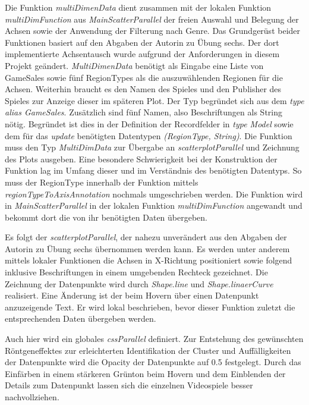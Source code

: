 \documentclass[usegeometry=true]{scrartcl}
\begin{document}
Die Funktion \textit{multiDimenData} dient zusammen mit der lokalen Funktion \textit{multiDimFunction} aus \textit{MainScatterParallel} der freien Auswahl und Belegung der Achsen sowie der Anwendung der Filterung nach Genre. 
Das Grundgerüst beider Funktionen basiert auf den Abgaben der Autorin zu Übung sechs. 
Der dort implementierte Achsentausch wurde aufgrund der Anforderungen in diesem Projekt geändert.
\textit{MultiDimenData} benötigt als Eingabe eine Liste von GameSales sowie fünf RegionTypes als die auszuwählenden Regionen für die Achsen. 
Weiterhin braucht es den Namen des Spieles und den Publisher des Spieles zur Anzeige dieser im späteren Plot. 
Der Typ begründet sich aus dem \textit{type alias GameSales}.
Zusätzlich sind fünf Namen, also Beschriftungen als String nötig. 
Begründet ist dies in der Definition der Recordfelder in \textit{type Model} sowie dem für das \textit{update} benötigten Datentypen \textit{(RegionType, String)}.
Die Funktion muss den Typ \textit{MultiDimData} zur Übergabe an \textit{scatterplotParallel} und Zeichnung des Plots ausgeben. 
Eine besondere Schwierigkeit bei der Konstruktion der Funktion lag im Umfang dieser und im Verständnis des benötigten Datentyps. 
So muss der RegionType innerhalb der Funktion mittels \textit{regionTypeToAxisAnnotation} nochmals umgeschrieben werden. 
Die Funktion wird in \textit{MainScatterParallel} in der lokalen Funktion \textit{multiDimFunction} angewandt und bekommt dort die von ihr benötigten Daten übergeben.

Es folgt der \textit{scatterplotParallel}, der nahezu unverändert aus den Abgaben der Autorin zu Übung sechs übernommen werden kann. 
Es werden unter anderem mittels lokaler Funktionen die Achsen in X-Richtung positioniert sowie folgend inklusive Beschriftungen in einem umgebenden Rechteck gezeichnet.
Die Zeichnung der Datenpunkte wird durch \textit{Shape.line} und \textit{Shape.linaerCurve} realisiert.
Eine Änderung ist der beim Hovern über einen Datenpunkt anzuzeigende Text. Er wird lokal beschrieben, bevor dieser Funktion zuletzt die entsprechenden Daten übergeben werden.

Auch hier wird ein globales \textit{cssParallel} definiert.
Zur Entstehung des gewünschten Röntgeneffektes zur erleichterten Identifikation der Cluster und Auffälligkeiten der Datenpunkte wird die Opacity der Datenpunkte auf 0.5 festgelegt.
Durch das Einfärben in einem stärkeren Grünton beim Hovern und dem Einblenden der Details zum Datenpunkt lassen sich die einzelnen Videospiele besser nachvollziehen.
\end{document}
